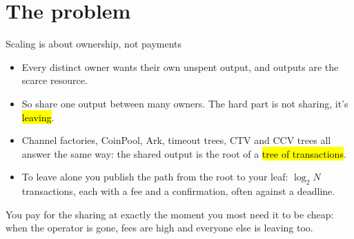 \documentclass[aspectratio=169,10pt]{beamer}
\begin{document}
\section{The problem}

\begin{frame}{Scaling is about ownership, not payments}
  \begin{itemize}
    \item Every distinct owner wants their own unspent output, and outputs are the scarce resource.
    \item So share one output between many owners. The hard part is not sharing, it's \hl{leaving}.
    \item Channel factories, CoinPool, Ark, timeout trees, CTV and CCV trees all answer the same way:
      the shared output is the root of a \hl{tree of transactions}.
    \item To leave alone you publish the path from the root to your leaf:
      $\log_2 N$ transactions, each with a fee and a confirmation, often against a deadline.
  \end{itemize}
  \vspace{0.6em}
  \begin{block}{}
    You pay for the sharing at exactly the moment you most need it to be cheap:
    when the operator is gone, fees are high and everyone else is leaving too.
  \end{block}
\end{frame}
\end{document}
